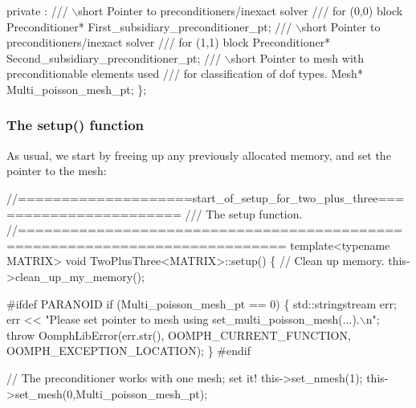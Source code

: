 \begin{DoxyCodeInclude}
 private :
  \textcolor{comment}{}
\textcolor{comment}{  /// \(\backslash\)short Pointer to preconditioners/inexact solver}
\textcolor{comment}{  /// for (0,0) block}
\textcolor{comment}{}  Preconditioner* First\_subsidiary\_preconditioner\_pt;
  \textcolor{comment}{}
\textcolor{comment}{  /// \(\backslash\)short Pointer to preconditioners/inexact solver}
\textcolor{comment}{  /// for (1,1) block}
\textcolor{comment}{}  Preconditioner* Second\_subsidiary\_preconditioner\_pt;
\textcolor{comment}{}
\textcolor{comment}{  /// \(\backslash\)short Pointer to mesh with preconditionable elements used}
\textcolor{comment}{  /// for classification of dof types.  }
\textcolor{comment}{}  Mesh* Multi\_poisson\_mesh\_pt; 
 \};

\end{DoxyCodeInclude}
\hypertarget{index_two_plus_three_setup}{}\subsubsection{The setup() function}\label{index_two_plus_three_setup}
As usual, we start by freeing up any previously allocated memory, and set the pointer to the mesh\+:


\begin{DoxyCodeInclude}
 \textcolor{comment}{//====================start\_of\_setup\_for\_two\_plus\_three=======================}\textcolor{comment}{}
\textcolor{comment}{ /// The setup function.}
\textcolor{comment}{} \textcolor{comment}{//============================================================================}
 \textcolor{keyword}{template}<\textcolor{keyword}{typename} MATRIX> 
 \textcolor{keywordtype}{void} TwoPlusThree<MATRIX>::setup()
 \{
  \textcolor{comment}{// Clean up memory.}
  this->clean\_up\_my\_memory();

\textcolor{preprocessor}{#ifdef PARANOID}
  \textcolor{keywordflow}{if} (Multi\_poisson\_mesh\_pt == 0)
   \{
    std::stringstream err;
    err << \textcolor{stringliteral}{"Please set pointer to mesh using set\_multi\_poisson\_mesh(...).\(\backslash\)n"};
    \textcolor{keywordflow}{throw} OomphLibError(err.str(),
                        OOMPH\_CURRENT\_FUNCTION,
                        OOMPH\_EXCEPTION\_LOCATION);
   \}
\textcolor{preprocessor}{#endif }
  
  \textcolor{comment}{// The preconditioner works with one mesh; set it!}
  this->set\_nmesh(1);
  this->set\_mesh(0,Multi\_poisson\_mesh\_pt);

\end{DoxyCodeInclude}



